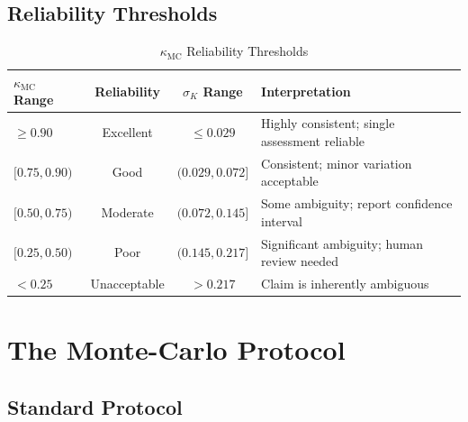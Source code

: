 \documentclass[11pt,a4paper]{article}
\theoremstyle{remark}
\begin{document}
\subsection{Reliability Thresholds}

\begin{table}[h]
\centering
\caption{$\kappa_{\text{MC}}$ Reliability Thresholds}
\label{tab:kappa-thresholds}
\begin{tabular}{lccp{5.5cm}}
\toprule
\textbf{$\kappa_{\text{MC}}$ Range} & \textbf{Reliability} & \textbf{$\sigma_K$ Range} & \textbf{Interpretation} \\
\midrule
$\geq 0.90$ & Excellent & $\leq 0.029$ & Highly consistent; single assessment reliable \\
$[0.75, 0.90)$ & Good & $(0.029, 0.072]$ & Consistent; minor variation acceptable \\
$[0.50, 0.75)$ & Moderate & $(0.072, 0.145]$ & Some ambiguity; report confidence interval \\
$[0.25, 0.50)$ & Poor & $(0.145, 0.217]$ & Significant ambiguity; human review needed \\
$< 0.25$ & Unacceptable & $> 0.217$ & Claim is inherently ambiguous \\
\bottomrule
\end{tabular}
\end{table}


\section{The Monte-Carlo Protocol}
\label{sec:protocol}

\subsection{Standard Protocol}
\end{document}
